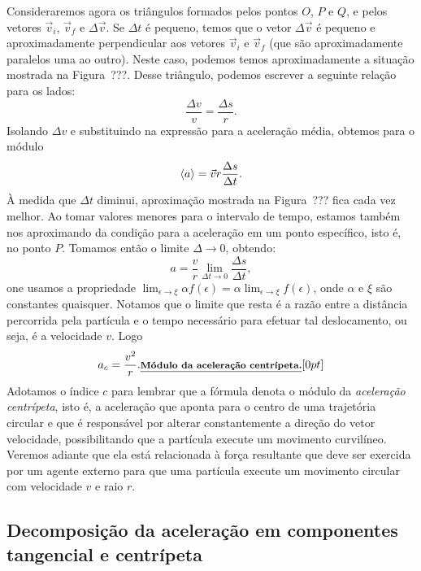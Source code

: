 Consideraremos agora os triângulos formados pelos pontos $O$, $P$ e $Q$, e pelos vetores $\vec{v}_i$, $\vec{v}_f$ e $\Delta \vec{v}$. 
Se $\Delta t$ é pequeno, temos que o vetor $\Delta \vec{v}$ é pequeno e aproximadamente perpendicular aos vetores $\vec{v}_i$ e $\vec{v}_f$ (que são aproximadamente paralelos uma ao outro). Neste caso, podemos temos aproximadamente a situação mostrada na Figura~???. Desse triângulo, podemos escrever a seguinte relação para os lados:
\begin{equation}
  \frac{\Delta v}{v} = \frac{\Delta s}{r}.
\end{equation}
%
Isolando $\Delta v$ e substituindo na expressão para a aceleração média, obtemos para o módulo
\begin{equation}
  \left\langle{a}\right\rangle = \vec{v}{r} \frac{\Delta s}{\Delta t}.
\end{equation}
%
À medida  que $\Delta t$ diminui, aproximação mostrada na Figura~??? %
fica cada vez melhor. Ao tomar valores menores para o intervalo de tempo, estamos também nos aproximando da condição para a aceleração em um ponto específico, isto é, no ponto $P$. Tomamos então o limite $\Delta \to 0$, obtendo:
\begin{equation}
  a = \frac{v}{r} \lim_{\Delta t \to 0} \frac{\Delta s}{\Delta t},
\end{equation}
%
one usamos a propriedade $\lim_{\epsilon \to \xi} \alpha f(\epsilon) = \alpha \lim_{\epsilon\to \xi} f(\epsilon)$, onde $\alpha$ e $\xi$ são constantes quaisquer. Notamos que o limite que resta é a razão entre a distância percorrida pela partícula e o tempo necessário para efetuar tal deslocamento, ou seja, é a velocidade $v$. Logo
\begin{equation}\label{Eq:AceleracaoCentripeta}
  a_c = \frac{v^2}{r}. \relax{\footnotesize\emph{\textbf{Módulo da aceleração centrípeta.}}}[0pt]
\end{equation}
%
Adotamos o índice $c$ para lembrar que a fórmula denota o módulo da \emph{aceleração centrípeta}, isto é, a aceleração que aponta para o centro de uma trajetória circular e que é responsável por alterar constantemente a direção do vetor velocidade, possibilitando que a partícula execute um movimento curvilíneo. Veremos adiante que ela está relacionada à força resultante que deve ser exercida por um agente externo para que uma partícula execute um movimento circular com velocidade $v$ e raio $r$.

\subsection{Decomposição da aceleração em componentes tangencial e centrípeta}

